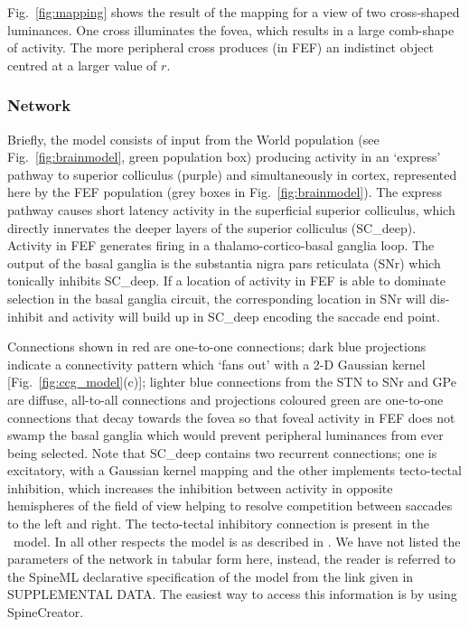 \documentclass{frontiersSCNS}
\begin{document}
Fig.~\ref{fig:mapping} shows the result of the mapping for a view of
two cross-shaped luminances. One cross illuminates the fovea, which
results in a large comb-shape of activity. The more peripheral cross
produces (in FEF) an indistinct object centred at a larger value of
$r$.

\subsubsection{Network}

Briefly, the model consists of input from the World population (see
Fig.~\ref{fig:brainmodel}, green population box) producing activity in an
`express' pathway to superior colliculus (purple) and simultaneously
in cortex, represented here by the FEF population (grey boxes in
Fig.~\ref{fig:brainmodel}). The express pathway causes short latency
activity in the superficial superior colliculus, which directly
innervates the deeper layers of the superior colliculus
(SC\_deep). Activity in FEF generates firing in a
thalamo-cortico-basal ganglia loop. The output of the basal ganglia is
the substantia nigra pars reticulata (SNr) which tonically inhibits
SC\_deep. If a location of activity in FEF is able to dominate
selection in the basal ganglia circuit, the corresponding location in
SNr will dis-inhibit and activity will build up in SC\_deep encoding
the saccade end point.

Connections shown in red are one-to-one connections; dark blue
projections indicate a connectivity pattern which `fans out' with a
2-D Gaussian kernel [Fig.~\ref{fig:ccg_model}(c)]; lighter blue
connections from the STN to SNr and GPe are diffuse, all-to-all
connections and projections coloured green are one-to-one connections
that decay towards the fovea so that foveal activity in FEF does not
swamp the basal ganglia which would prevent peripheral luminances from
ever being selected.
%
Note that SC\_deep contains two recurrent connections; one is
excitatory, with a Gaussian kernel mapping and the other implements
tecto-tectal inhibition, which increases the inhibition between
activity in opposite hemispheres of the field of
view \citep{gian_g._mascetti_tectotectal_1981,olivier_evidence_2000}
helping to resolve competition between saccades to the left and
right. The tecto-tectal inhibitory connection is  present in
the \ccg~model. In all other respects the model is as described in
\cite{cope_basal_2017}.
%
We have not listed the parameters of the network in tabular form here,
instead, the reader is referred to the SpineML declarative
specification of the model from the link given in SUPPLEMENTAL DATA.
The easiest way to access this information is by using SpineCreator.
\end{document}
